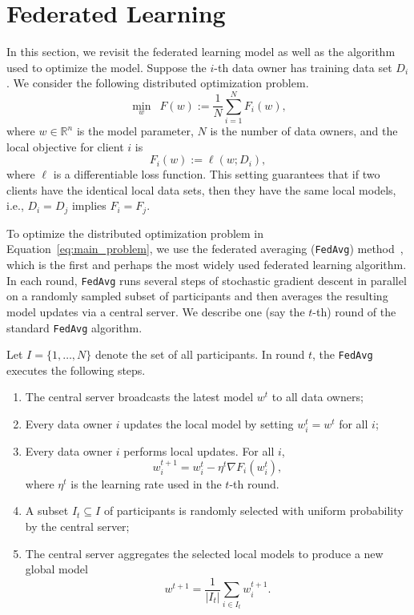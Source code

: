 \section{Federated Learning} \label{sec:7.3}
In this section, we revisit the federated learning model as well as the algorithm used to optimize the model. Suppose the $i$-th data owner has training data set $D_i$. We consider the following distributed optimization problem.
\begin{equation} \label{eq:main_problem}
    \min_{w}\enspace F(w) := \frac{1}{N}\sum_{i = 1}^N F_i(w),
\end{equation}
where $w\in\mathbb{R}^n$ is the model parameter, $N$ is the number of data owners, and the local objective for client $i$ is
\begin{equation} \label{eq:loss}
    F_i(w) := \ell(w; D_i),
\end{equation}
where $\ell$ is a differentiable loss function. This setting guarantees that if two clients have the identical local data sets, then they have the same local models, i.e., $D_i=D_j$ implies $F_i=F_j$. 

To optimize the distributed optimization problem in Equation~\eqref{eq:main_problem}, we use the federated averaging (\texttt{FedAvg}) method~\cite{mcmahan2017communication}, which is the first and perhaps the most widely used federated learning algorithm. In each round, \texttt{FedAvg} runs several steps of stochastic gradient descent in parallel on a randomly sampled subset of participants and then averages the resulting model updates via a central server. We describe one (say the $t$-th) round of the standard \texttt{FedAvg} algorithm. 

Let $I = \{1, \dots, N\}$ denote the set of all participants. In round $t$, the \texttt{FedAvg} executes the following steps.
\begin{enumerate}
    \item The central server broadcasts the latest model $w^t$ to all data owners;
    \item Every data owner $i$ updates the local model by setting $w_i^t = w^t$ for all $i$;
    \item Every data owner $i$ performs local updates. For all $i$,
    \begin{equation} \label{eq:local_step}
        w_i^{t+1} = w_i^t - \eta^t \nabla F_i(w_i^t),
    \end{equation}
    where $\eta^t$ is the learning rate used in the $t$-th round. 
    \item A subset $I_t \subseteq I$ of participants is randomly selected with uniform probability by the central server;
    \item The central server aggregates the selected local models to produce a new global model
    \begin{equation} \label{eq:global_step}
        w^{t+1} = \frac{1}{|I_t|} \sum_{i \in I_t} w_i^{t+1}.
    \end{equation}
\end{enumerate}

